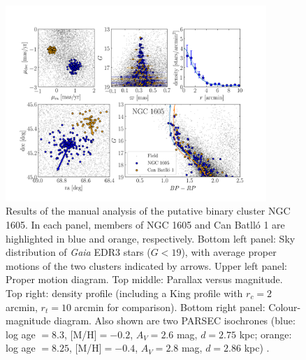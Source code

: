 \documentclass[RNAAS]{aastex631}
\begin{document}
\begin{figure}
\begin{center}
\includegraphics[width=0.88\textwidth,angle=0]{../im/ngc1605_manual_analysis.png}
\caption{Results of the manual analysis of the putative binary cluster NGC 1605. In each panel, members of NGC 1605 and Can Batlló 1 are highlighted in blue and orange, respectively. Bottom left panel: Sky distribution of {\it Gaia} EDR3 stars ($G<19$), with average proper motions of the two clusters indicated by arrows. Upper left panel: Proper motion diagram. Top middle: Parallax versus magnitude. Top right: density profile (including a King profile with $r_c=2$ arcmin, $r_t=10$ arcmin for comparison). Bottom right panel: Colour-magnitude diagram. Also shown are two PARSEC isochrones (blue: log age $=8.3$, [M/H]$=-0.2$, $A_V=2.6$ mag, $d=2.75$ kpc; orange: log age $=8.25$, [M/H]$=-0.4$, $A_V=2.8$ mag, $d=2.86$ kpc) . 
\label{fig:1}}
\end{center}
\end{figure}
\end{document}
